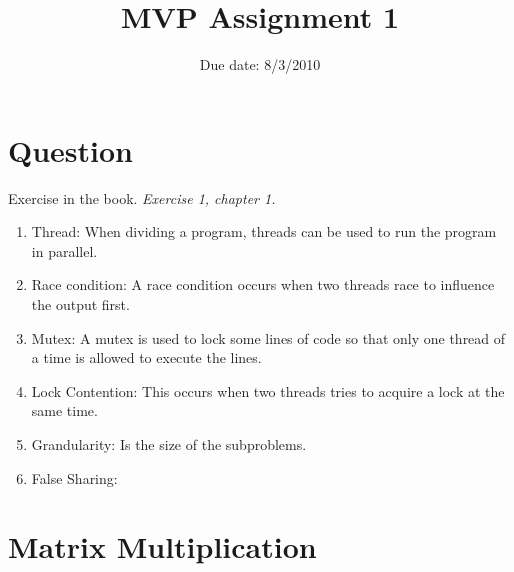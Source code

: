 \documentclass{article}
\title{MVP Assignment 1}
\date{Due date: 8/3/2010}
\begin{document}
\maketitle

\newcommand{\question}[1]{#1}
\newcommand{\answer}[1]{}


%
%
\answer{
\begin{flushleft}
{\bf Group room:} FIXME\\
{\bf Group number:} FIXME
\end{flushleft}
}

\section{Question}

\begin{ExerciseList}
\Exercise Exercise in the book.
\Question \emph{Exercise 1, chapter 1.}
\Answer
\begin{enumerate}
	\item Thread: When dividing a program, threads can be used to run the program in parallel.
	\item Race condition: A race condition occurs when two threads race to influence the output first. 
	\item Mutex: A mutex is used to lock some lines of code so that only one thread of a time is allowed to execute the lines.
	\item Lock Contention: This occurs when two threads tries to acquire a lock at the same time.
	\item Grandularity: Is the size of the subproblems.
	\item False Sharing: 
\end{enumerate}

\end{ExerciseList}

\section{Matrix Multiplication}
\end{document}
